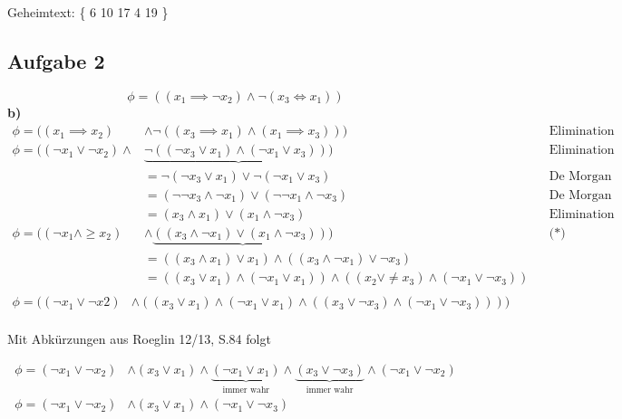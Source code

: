 Geheimtext: \{ 6 10 17 4 19 \}

\subsection*{Aufgabe 2}

\[
  \phi = ((x_1 \implies \neg x_2) \land \neg(x_3 \iff x_1))
\]
\textbf{b)} \\
\begin{align*}
  \phi = ((x_1 \implies x_2) &\land \neg ((x_3 \implies x_1) \land (x_1 \implies x_3))) && \text{Elimination der Äquivalenz} \\
  \phi = ((\neg x_1 \lor \neg x_2) \land &\underbrace{ \neg ((\neg x_3 \lor x_1) \land (\neg x_1 \lor x_3)))} && \text{Elimination der Implikation}\\
%
  &= \neg (\neg x_3 \lor x_1) \lor \neg (\neg x_1 \lor x_3) && \text{De Morgan} \\
%
  &= (\neg \neg x_3 \land \neg x_1) \lor (\neg \neg x_1 \land \neg x_3) && \text{De Morgan} \\
%
  &=(x_3 \land x_1) \lor (x_1 \land \neg x_3) && \text{Elimination der doppelten Negation} \\
%
  \phi = ((\neg x_1 \land \geq x_2) &\land \underbrace{((x_3 \land \neg x_1) \lor (x_1 \land \neg x_3)))} && \text{(*)}\\
%
  &= ((x_3 \land x_1) \lor x_1) \land ((x_3 \land \neg x_1) \lor \neg x_3) \\
%
  &= ((x_3 \lor x_1) \land (\neg x_1 \lor x_1)) \land ((x_2 \lor \neq x_3) \land (\neg x_1 \lor \neg x_3))\\
%
\end{align*}
%
\begin{align*}
  \phi = ((\neg x_1 \lor \neg x2) &\land ((x_3 \lor x_1) \land (\neg x_1 \lor x_1) \land ((x_3 \lor \neg x_3) \land (\neg x_1 \lor \neg x_3)))) \\
\end{align*}

Mit Abkürzungen aus Roeglin 12/13, S.84 folgt

\begin{align*}
  \phi = (\neg x_1 \lor \neg x_2) &\land (x_3 \lor x_1) \land \underbrace{(\neg x_1 \lor x_1)}_{\text{immer wahr}} \land \underbrace{(x_3 \lor \neg x_3)}_{\text{immer wahr}} \land (\neg x_1 \lor \neg x_2) \\
  \phi = (\neg x_1 \lor \neg x_2)& \land (x_3 \lor x_1) \land (\neg x_1 \lor \neg x_3) \\
\end{align*}

